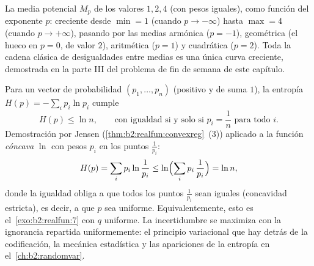 \begin{omfigure}

{\small La media potencial $M_p$ de los valores $1, 2, 4$ (con pesos
iguales), como función del exponente $p$: creciente desde $\min = 1$
(cuando $p \to -\infty$) hasta $\max = 4$ (cuando $p \to +\infty$),
pasando por las medias armónica ($p = -1$), geométrica (el hueco en
$p = 0$, de valor $2$), aritmética ($p = 1$) y cuadrática ($p = 2$).
Toda la cadena clásica de desigualdades entre medias es una única
curva creciente, demostrada en la parte III del problema de fin de
semana de este capítulo.}
\end{omfigure}

\begin{example}\label{ex:b2:realfun:entropy}
Para un vector de probabilidad $(p_1, \dots, p_n)$ (positivo y de
suma $1$), la entropía $H(p) = -\sum_i p_i\ln p_i$ cumple
\[
H(p) \leq \ln n ,
\qquad\text{con igualdad si y solo si } p_i = \frac1n
\text{ para todo } i .
\]
Demostración por Jensen (\cref{thm:b2:realfun:convexreg}~(3))
aplicado a la función \emph{cóncava} $\ln$ con pesos $p_i$ en los
puntos $\frac{1}{p_i}$:
\[
H(p) = \sum_i p_i\ln\frac{1}{p_i}
\leq \ln\Bigl(\sum_i p_i\,\frac1{p_i}\Bigr) = \ln n ,
\]
donde la igualdad obliga a que todos los puntos $\frac1{p_i}$ sean
iguales (concavidad estricta), es decir, a que $p$ sea uniforme.
Equivalentemente, esto es el~\cref{exo:b2:realfun:7} con $q$
uniforme. La incertidumbre se maximiza con la ignorancia repartida
uniformemente: el principio variacional que hay detrás de la
codificación, la mecánica estadística y las apariciones de la
entropía en el~\cref{ch:b2:randomvar}.
\end{example}

